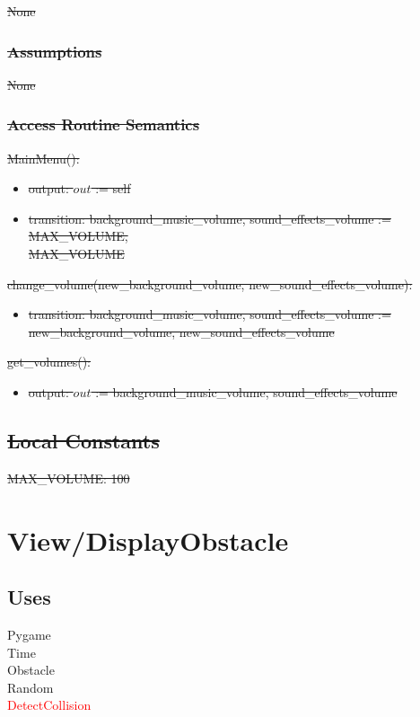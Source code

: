 \documentclass[12pt]{article}
\begin{document}
\sout{None}

\subsubsection* {\sout{Assumptions}}

\sout{None}

\subsubsection* {\sout{Access Routine Semantics}}

\sout{MainMenu():}
\begin{itemize}
    \item \sout{output: $out$ := self}
    \item \sout{transition: background\_music\_volume, sound\_effects\_volume := MAX\_VOLUME, \\ MAX\_VOLUME}
\end{itemize}
\noindent \sout{change\_volume(new\_background\_volume, new\_sound\_effects\_volume):}
\begin{itemize}
    \item \sout{transition: background\_music\_volume, sound\_effects\_volume := new\_background\_volume, new\_sound\_effects\_volume}
\end{itemize}
\noindent \sout{get\_volumes():}
\begin{itemize}
    \item \sout{output: $out$ := background\_music\_volume, sound\_effects\_volume }
\end{itemize}
\subsection* {\sout{Local Constants}}
\sout{MAX\_VOLUME: 100}

\newpage

\section*{View/DisplayObstacle}

\subsection* {Uses}

Pygame\\
Time\\
Obstacle\\
Random\\
\textcolor{red}{DetectCollision}
\end{document}
